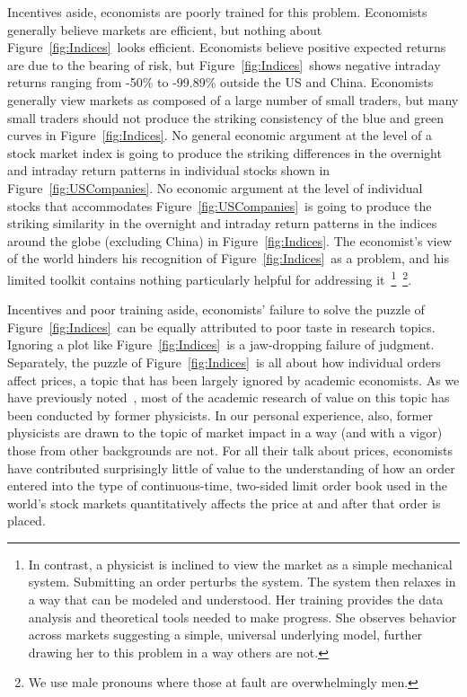 \documentclass[twocolumn,twoside,prd,floatfix,letterpaper]{revtex4}
\newcommand{\ldds}[1]{#1}  %
\def \FigMain {Figure~\ref{fig:Indices}}
\def \FigIndices {Figure~\ref{fig:Indices}}
\def \FigUSCompanies {Figure~\ref{fig:USCompanies}}
\begin{document}
Incentives aside, economists are poorly trained for this problem.  Economists generally believe markets are efficient, but nothing about \FigMain\ looks efficient.  Economists believe positive expected returns are due to the bearing of risk, but \FigMain\ shows negative intraday returns ranging from \ldds{-50\%} to \ldds{-99.89\%} outside the US and China.  Economists generally view markets as composed of a large number of small traders, but many small traders should not produce the striking consistency of the blue and green curves in \FigMain.  No general economic argument at the level of a stock market index is going to produce the striking differences in the overnight and intraday return patterns in individual stocks shown in \FigUSCompanies.  No economic argument at the level of individual stocks that accommodates \FigUSCompanies\ is going to produce the striking similarity in the overnight and intraday return patterns in the indices around the globe (excluding China) in \FigIndices.  The economist's view of the world hinders his recognition of \FigMain\ as a problem, and his limited toolkit contains nothing particularly helpful for addressing it~\footnote{In contrast, a physicist is inclined to view the market as a simple mechanical system.  Submitting an order perturbs the system.  The system then relaxes in a way that can be modeled and understood.  Her training provides the data analysis and theoretical tools needed to make progress.  She observes behavior across markets suggesting a simple, universal underlying model, further drawing her to this problem in a way others are not.}~\footnote{We use male pronouns where those at fault are overwhelmingly men.}.

Incentives and poor training aside, economists' failure to solve the puzzle of \FigMain\ can be equally attributed to poor taste in research topics.  Ignoring a plot like \FigMain\ is a jaw-dropping failure of judgment.  Separately, the puzzle of \FigMain\ is all about how individual orders affect prices, a topic that has been largely ignored by academic economists.  As we have previously noted~\cite{knuteson2018}, most of the academic research of value on this topic has been conducted by former physicists.  In our personal experience, also, former physicists are drawn to the topic of market impact in a way (and with a vigor) those from other backgrounds are not.  For all their talk about prices, economists have contributed surprisingly little of value to the understanding of how an order entered into the type of continuous-time, two-sided limit order book used in the world's stock markets quantitatively affects the price at and after that order is placed.
\end{document}

